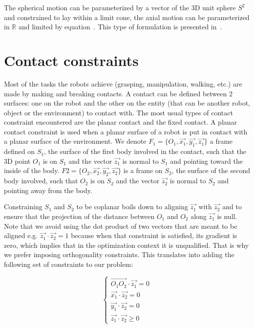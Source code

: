The spherical motion can be parameterized by a vector of the 3D unit sphere $S^2$ and constrained to lay within a limit cone, the axial motion can be parameterized in $\mathbb{R}$ and limited by equation~.
This type of formulation is presented in~\cite{baerlocher}.



\section{Contact constraints}
\label{sec:contact_constraints}


Most of the tasks the robots achieve (grasping, manipulation, walking, etc.) are made by making and breaking contacts.
A contact can be defined between 2 surfaces: one on the robot and the other on the entity (that can be another robot, object or the environment) to contact with.
The most usual types of contact constraint encountered are the planar contact and the fixed contact.
A planar contact constraint is used when a planar surface of a robot is put in contact with a planar surface of the environment.
We denote $F_1 = \{O_1, \vec{x_1}, \vec{y_1}, \vec{z_1}\}$ a frame defined on $S_1$, the surface of the first body involved in the contact, such that the 3D point $O_1$ is on $S_1$ and the vector $\vec{z_1}$ is normal to $S_1$ and pointing toward the inside of the body.
$F2 = \{O_2, \vec{x_2}, \vec{y_2}, \vec{z_2}\}$ is a frame on $S_2$, the surface of the second body involved, such that $O_2$ is on $S_2$ and the vector $\vec{z_2}$ is normal to $S_2$ and pointing away from the body.

Constraining $S_1$ and $S_2$ to be coplanar boils down to aligning $\vec{z_1}$ with $\vec{z_2}$ and to ensure that the projection of the distance between $O_1$ and $O_2$ along $\vec{z_1}$ is null.
Note that we avoid using the dot product of two vectors that are meant to be aligned e.g. $\vec{z_1}\cdot\vec{z_2} = 1$ because when that constraint is satisfied, its gradient is zero, which implies that in the optimization context it is unqualified.
That is why we prefer imposing orthogonality constraints.
This translates into adding the following set of constraints to our problem:

\begin{equation}
\label{eq:coplanarity}
\boxed{\left\{
  \begin{array}{l}
    \overrightarrow{O_1O_2} \cdot \vec{z_1} = 0\\
    \vec{x_1}\cdot\vec{z_2} = 0\\
    \vec{y_1}\cdot\vec{z_2} = 0\\
    \vec{z_1}\cdot\vec{z_2} \geq 0
  \end{array}
  \right.}
\end{equation}

